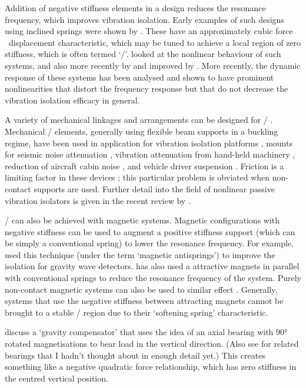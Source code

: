 Addition of negative stiffness elements in a design reduces the resonance frequency, which improves vibration isolation.
Early examples of such designs using inclined springs were shown by \textcite{molyneux1957}.
These have an approximately cubic force \vs\ displacement characteristic, which may be tuned to achieve a local region of zero stiffness, which is often termed `\qzs/'.
\textcite{alabuzhev1989} looked at the nonlinear behaviour of such
systems, and also more recently by
\textcite{carrella2006,carrella2007-jsv,carrella2008-jsv,carrella2009} and improved by
\textcite{kovacic2008}.
More recently, the dynamic response of these systems has been analysed \parencite{carrella2009,carrella2008-thesis} and shown to have prominent nonlinearities that distort the frequency response but that do not decrease the vibration isolation efficacy in general.

A variety of mechanical linkages and arrangements can be designed for \qzs/ \cite{tarnai2003}.
Mechanical \qzs/ elements, generally using flexible beam supports in a buckling regime, have been used in application for vibration isolation platforms \cite{platus1999}, mounts for seismic noise attenuation \cite{cella2005}, vibration attenuation from hand-held machinery \cite{sokolov2007}, reduction of aircraft cabin noise \cite{baklanov2007-jsv}, and vehicle driver suspension \cite{lee2007-jsv}.
Friction is a limiting factor in these devices \cite{sokolov2007}; this particular problem is obviated when non-contact supports are used.
Further detail into the field  of nonlinear passive vibration isolators is given in the recent review by \textcite{ibrahim2008}.

\QZS/ can also be achieved with magnetic systems.
Magnetic configurations with negative stiffness can be used to augment a positive stiffness support (which can be simply a conventional spring) to lower the resonance frequency.
For example, \textcite{beccaria1997} used this technique (under the term `magnetic antisprings') to improve the isolation for gravity wave detectors.
\textcite{carrella2007-euromech,carrella2008-thesis} has also used a attractive magnets in parallel with conventional springs to reduce the resonance frequency of the system.
Purely non-contact magnetic systems can also be used to similar effect \cite{robertson2006,robertson2007}.
Generally, systems that use the negative stiffness between attracting magnets cannot be brought to a stable \qzs/ region due to their `softening spring' characteristic.

\textcite{hol2006} discuss a `gravity compensator' that uses the idea of an axial bearing with \ang{90} rotated magnetisations to bear load in the vertical direction.
(Also see \textcite{yonnet1981} for related bearings that I hadn't thought about in enough detail yet.)
This creates something like a negative quadratic force relationship, which has zero stiffness in the centred vertical position.

